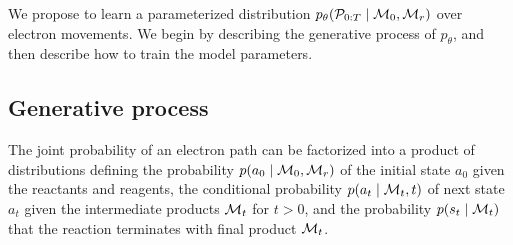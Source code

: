 We propose to learn a parameterized distribution $p_\theta( {\mathcal{P}}_{0:T} \mid {\mathcal{M}}_0, {\mathcal{M}}_r)$ over electron movements. 
We begin by describing the generative process %
of $p_\theta$, and then describe how to train the model parameters.


\subsection{Generative process}

The joint probability of an electron path can be factorized into a product of distributions
defining the probability $p(a_0 \mid {\mathcal{M}}_0, {\mathcal{M}}_r)$ of the initial state $a_0$ given the reactants and reagents, 
the conditional probability $p(a_t \mid {\mathcal{M}}_t, t)$  of next state $a_t$ given the intermediate products ${\mathcal{M}}_t$ for $t > 0$,
and the probability $p(s_t \mid {\mathcal{M}}_t)$ that the reaction terminates with final product ${\mathcal{M}}_{t}$.

%



